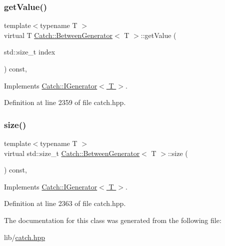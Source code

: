 \subsubsection{\texorpdfstring{get\+Value()}{getValue()}}
{\footnotesize\ttfamily template$<$typename T $>$ \\
virtual T \hyperlink{class_catch_1_1_between_generator}{Catch\+::\+Between\+Generator}$<$ T $>$\+::get\+Value (\begin{DoxyParamCaption}\item[{std\+::size\+\_\+t}]{index }\end{DoxyParamCaption}) const\hspace{0.3cm}{\ttfamily [inline]}, {\ttfamily [virtual]}}



Implements \hyperlink{struct_catch_1_1_i_generator_ad69e937cb66dba3ed9429c42abf4fce3}{Catch\+::\+I\+Generator$<$ T $>$}.



Definition at line 2359 of file catch.\+hpp.

\hypertarget{class_catch_1_1_between_generator_af65a1fe51f9b1106fc676e3dd189adb6}{}\label{class_catch_1_1_between_generator_af65a1fe51f9b1106fc676e3dd189adb6} 
\subsubsection{\texorpdfstring{size()}{size()}}
{\footnotesize\ttfamily template$<$typename T $>$ \\
virtual std\+::size\+\_\+t \hyperlink{class_catch_1_1_between_generator}{Catch\+::\+Between\+Generator}$<$ T $>$\+::size (\begin{DoxyParamCaption}{ }\end{DoxyParamCaption}) const\hspace{0.3cm}{\ttfamily [inline]}, {\ttfamily [virtual]}}



Implements \hyperlink{struct_catch_1_1_i_generator_a2e317253b03e838b6065ce69719a198e}{Catch\+::\+I\+Generator$<$ T $>$}.



Definition at line 2363 of file catch.\+hpp.



The documentation for this class was generated from the following file\+:\begin{DoxyCompactItemize}
\item 
lib/\hyperlink{catch_8hpp}{catch.\+hpp}\end{DoxyCompactItemize}
